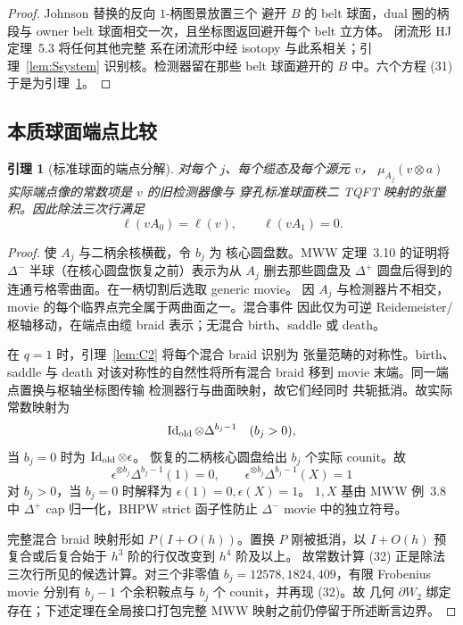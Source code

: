 \documentclass[11pt]{amsart}
\newtheorem{lemma}[theorem]{引理}
\theoremstyle{definition}
\theoremstyle{remark}
\begin{document}
\begin{proof}
Johnson 替换的反向 $1$-柄图景放置三个
避开 $B$ 的 belt 球面，dual 圈的柄段与
owner belt 球面相交一次，且坐标图返回避开每个 belt 立方体。
闭流形 HJ 定理~5.3 将任何其他完整
系在闭流形中经 isotopy 与此系相关；引理~\ref{lem:Ssystem}
识别核。检测器留在那些 belt
球面避开的 $B$ 中。六个方程 (31) 于是为引理~\ref{lem:Sendpoint}。
\end{proof}

\subsection{本质球面端点比较}

\begin{lemma}[标准球面的端点分解]\label{lem:Sendpoint}
对每个 \(j\)、每个缆态及每个源元 \(v\)，
\(\mu_{A_j}(v\otimes a)\) 实际端点像的常数项是 \(v\) 的旧检测器像与
穿孔标准球面秩二 TQFT 映射的张量积。因此除法三次行满足
\[
\ell(vA_0)=\ell(v),\qquad \ell(vA_1)=0.
\]
\end{lemma}

\begin{proof}
使 \(A_j\) 与二柄余核横截，令 \(b_j\) 为
核心圆盘数。MWW 定理~3.10 的证明将
\(\Delta^-\) 半球（在核心圆盘恢复之前）表示为从 \(A_j\) 删去那些圆盘及
\(\Delta^+\) 圆盘后得到的连通亏格零曲面。在一柄切割后选取 generic movie。
因 \(A_j\) 与检测器片不相交，movie 的每个临界点完全属于两曲面之一。混合事件
因此仅为可逆 Reidemeister/枢轴移动，在端点由缆 braid 表示；无混合 birth、saddle 或 death。

在 \(q=1\) 时，引理~\ref{lem:C2} 将每个混合 braid 识别为
张量范畴的对称性。birth、saddle 与 death
对该对称性的自然性将所有混合 braid 移到 movie 末端。同一端点置换与枢轴坐标图传输
检测器行与曲面映射，故它们经同时
共轭抵消。故实际常数映射为
\[
\operatorname{Id}_{\rm old}\otimes\Delta^{b_j-1}\quad(b_j>0),
\]
当 \(b_j=0\) 时为 \(\operatorname{Id}_{\rm old}\otimes\epsilon\)。
恢复的二柄核心圆盘给出 \(b_j\) 个实际 counit。故
\[
\epsilon^{\otimes b_j}\Delta^{b_j-1}(1)=0,\qquad
\epsilon^{\otimes b_j}\Delta^{b_j-1}(X)=1
\tag{32}
\]
对 \(b_j>0\)，当 \(b_j=0\) 时解释为
\(\epsilon(1)=0,\epsilon(X)=1\)。
\(1,X\) 基由 MWW
例~3.8 中 \(\Delta^+\) cap 归一化，BHPW strict 函子性防止
\(\Delta^-\) movie 中的独立符号。

完整混合 braid 映射形如 \(P(I+O(h))\)。置换
\(P\) 刚被抵消，以 \(I+O(h)\) 预复合或后复合始于
$h^3$ 阶的行仅改变到 $h^4$ 阶及以上。
故常数计算 (32) 正是除法三次行所见的候选计算。对三个非零值
$b_j=12578,1824,409$，有限 Frobenius movie 分别有
$b_j-1$ 个余积鞍点与 $b_j$ 个 counit，并再现 (32)。故
几何 $\partial W_2$ 绑定存在；下述定理在全局接口打包完整 MWW 映射之前仍停留于所述断言边界。
\end{proof}
\end{document}
